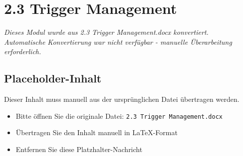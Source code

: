 
\section{2.3 Trigger Management}
\label{sec:2.3-trigger-management}

\begin{center}
\textit{Dieses Modul wurde aus 2.3 Trigger Management.docx konvertiert.\\
Automatische Konvertierung war nicht verfügbar - manuelle Überarbeitung erforderlich.}
\end{center}


\subsection{Placeholder-Inhalt}

Dieser Inhalt muss manuell aus der ursprünglichen Datei übertragen werden.

\begin{itemize}
\item Bitte öffnen Sie die originale Datei: \texttt{2.3 Trigger Management.docx}
\item Übertragen Sie den Inhalt manuell in LaTeX-Format
\item Entfernen Sie diese Platzhalter-Nachricht
\end{itemize}
